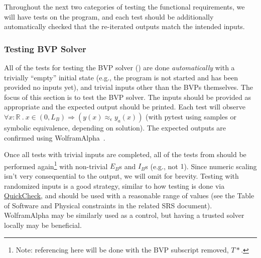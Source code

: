 \documentclass[12pt, titlepage]{article}
\begin{document}
Throughout the next two categories of testing the functional requirements, we
will have tests on the program, and each test should be additionally
automatically checked that the re-iterated outputs match the intended inputs.

\subsubsection{Testing BVP Solver}

All of the tests for testing the BVP solver ()
are done \textit{automatically} with a trivially ``empty'' initial state (e.g.,
the program is not started and has been provided no inputs yet), and trivial
inputs other than the BVPs themselves. The focus of this section is to test the
BVP solver. The inputs should be provided as appropriate and the expected output
should be printed. Each test will observe \(\forall x : \mathbb{R} ~.~x \in (0,
L_B) \Rightarrow (y(x) \approx_{\epsilon} y_a(x))\) (with pytest using samples
or symbolic equivalence, depending on solution). The expected outputs are
confirmed using WolframAlpha~\cite{WolframAlpha}.

Once all tests with trivial inputs are completed, all of the tests from
 should be performed again\footnote{Note:
referencing here will be done with the BVP subscript removed, $T*$.} with
non-trivial $E_B$s and $I_B$s (e.g., not $1$). Since numeric scaling isn't very
consequential to the output, we will omit for brevity. Testing with randomized
inputs is a good strategy, similar to how testing is done via
\href{https://hackage.haskell.org/package/QuickCheck}{QuickCheck}, and should be
used with a reasonable range of values (see the Table of Software and Physical
constraints in the related SRS document). WolframAlpha may be similarly used as
a control, but having a trusted solver locally may be beneficial.
\end{document}
